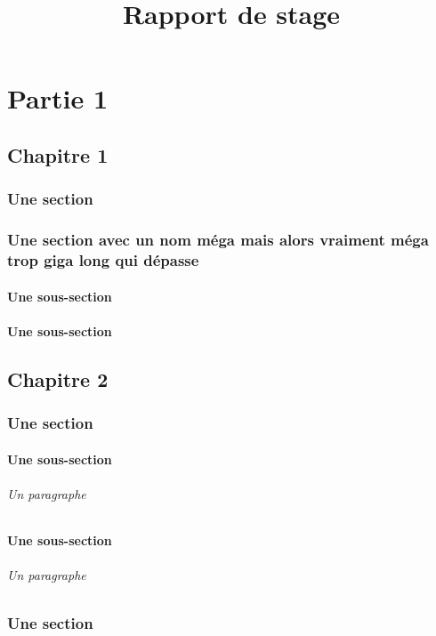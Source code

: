 \documentclass{book}
\begin{document}
\title{Rapport de stage}
\maketitle


\part{Partie 1}
	\chapter{Chapitre 1}
		\section*{Une section}
		\section[un titre plus court]{ Une section avec un nom méga mais alors 	vraiment méga trop giga long qui dépasse}
		\subsection{Une sous-section}
		\subsection{Une sous-section}
	\chapter{Chapitre 2}
		\section{Une section}
			\subsection{Une sous-section}
				\paragraph{Un paragraphe}
			\subsection{Une sous-section}
				\paragraph{Un paragraphe}
		\section{Une section}
\end{document}
